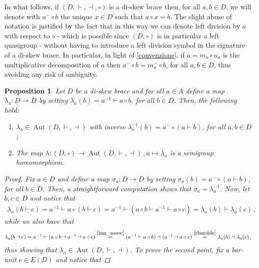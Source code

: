 \documentclass[preprint,1p]{elsarticle}
\numberwithin{equation}{section}
\newtheorem{prop}[theor]{Proposition}
\theoremstyle{definition}               %
\newcommand{\vd}{\vdash}
\newcommand{\dv}{\dashv}
\newcommand{\overeq}[1]{\overset{#1}{=}}
\DeclareMathOperator{\Aut}{Aut}
\begin{document}
In what follows, if $(D,\vd,\dv,\circ)$ is a di-skew brace then, for all $a,b \in D$, we will denote with $a^- \circ b$ the unique $x \in D$ such that $a \circ x = b$.
{The slight abuse of notation is justified by the fact that in this way we can denote left division by $a$ with respect to $\circ$ - which is possible since $(D,\circ)$ is in particular a left quasigroup - without having to introduce a left division symbol in the signature of a di-skew brace.}
In particular, in light of \cref{convenzione}, if $a = m_a \circ u_a$ is the multiplicative decomposition of $a$ then $a^- \circ b = {m_a^{-}} \circ b$, for all $a,b \in D$, {thus avoiding any risk of ambiguity.}

\smallskip

\begin{prop}\label{digroup_lambda}
    Let $D$ be a di-skew brace and for all $a \in A$ define a map $\lambda_a:D \to D$ by setting $\lambda_a(b) = a^{-1} \vd a \circ b$, for all $b \in D$.
    Then, the following hold:
    \begin{enumerate}
        \item[1)] $\lambda_a \in \Aut(D,\vd,\dv)$ with inverse $\lambda_a^{-1}(b) = a^- \circ (a \vd b)$, for all $a,b \in D$;
        \item[2)] The map $\lambda:(D,\circ) \to \Aut(D,\vd,\dv)\,, a \mapsto \lambda_a$ is a semigroup homomorphism.
    \end{enumerate}
    \begin{proof}
        Fix $a \in D$ and define a map $\sigma_a:D \to D$ by setting $\sigma_a(b) = a^- \circ (a \vd b)$, for all $b \in D$.
        Then, a straightforward computation shows that $\sigma_a = \lambda_a^{-1}$.
        Now, let $b,c \in D$ and notice that
        \begin{align*}
            \lambda_a(b \vd c) =
            a^{-1} \vd a \circ (b \vd c) 
            = a^{-1} \vd (a \circ b \vd a^{-1} \vd a \circ c) 
            = \lambda_a(b) \vd \lambda_a(c) \,,
        \end{align*}
        while we also have that
        \begin{align*}
            \lambda_a(b \dv c) 
            = a^{-1} \vd (a \circ b \dv a^{-1} \dv a \circ c) 
            \overeq{\eqref{inn_assoc}} (a^{-1} \vd a \circ b) \dv (a^{-1} \dv a \circ c) 
            \overeq{\eqref{rbarside}} \lambda_a(b) \dv \lambda_a(c)\,,
        \end{align*}
        thus showing that $\lambda_a \in \Aut(D,\vd,\dv)$.
        To prove the second point, fix a bar-unit $e\in E(D)$ and notice that 

\end{proof}
\end{prop}
\end{document}

